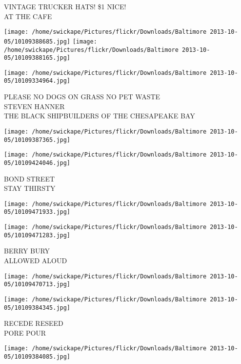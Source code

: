 \documentclass[10pt,letterpaper]{article}
\begin{document}
VINTAGE TRUCKER HATS! \$1 NICE!\\
AT THE CAFE\\
\pagebreak

\texttt{[image: /home/swickape/Pictures/flickr/Downloads/Baltimore 2013-10-05/10109388685.jpg]}
\texttt{[image: /home/swickape/Pictures/flickr/Downloads/Baltimore 2013-10-05/10109388165.jpg]}

\vspace{0.25in}
\texttt{[image: /home/swickape/Pictures/flickr/Downloads/Baltimore 2013-10-05/10109334964.jpg]}

PLEASE NO DOGS ON GRASS NO PET WASTE\\
STEVEN HANNER\\
THE BLACK SHIPBUILDERS OF THE CHESAPEAKE BAY\\
\pagebreak

\texttt{[image: /home/swickape/Pictures/flickr/Downloads/Baltimore 2013-10-05/10109387365.jpg]}

\vspace{0.25in}
\texttt{[image: /home/swickape/Pictures/flickr/Downloads/Baltimore 2013-10-05/10109424046.jpg]}

BOND STREET\\
STAY THIRSTY\\
\pagebreak

\texttt{[image: /home/swickape/Pictures/flickr/Downloads/Baltimore 2013-10-05/10109471933.jpg]}

\vspace{0.25in}
\texttt{[image: /home/swickape/Pictures/flickr/Downloads/Baltimore 2013-10-05/10109471283.jpg]}

BERRY BURY\\
ALLOWED ALOUD\\
\pagebreak

\texttt{[image: /home/swickape/Pictures/flickr/Downloads/Baltimore 2013-10-05/10109470713.jpg]}

\vspace{0.25in}
\texttt{[image: /home/swickape/Pictures/flickr/Downloads/Baltimore 2013-10-05/10109384345.jpg]}

RECEDE RESEED\\
PORE POUR\\
\pagebreak

\texttt{[image: /home/swickape/Pictures/flickr/Downloads/Baltimore 2013-10-05/10109384085.jpg]}
\end{document}
